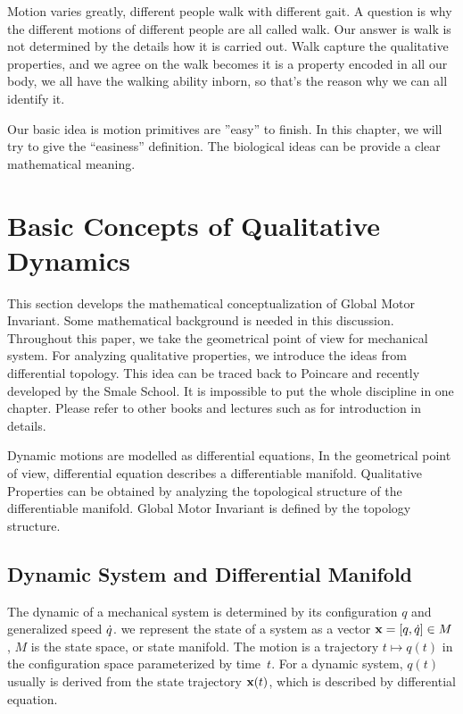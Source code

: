 \ifpdf
    \graphicspath{{GlobalInvariant/GlobalInvariantFigs/PNG/}{GlobalInvariant/GlobalInvariantFigs/PDF/}{GlobalInvariant/GlobalInvariantFigs/}}
\else
    \graphicspath{{GlobalInvariant/GlobalInvariantFigs/EPS/}{GlobalInvariant/GlobalInvariantFigs/}}
\fi

Motion varies greatly, different people walk with different gait. 
A question is why the different motions of different people are all called walk.
Our answer is walk is not determined by the details how it is carried out.
Walk capture the qualitative properties, and we agree on the walk becomes it is a property encoded in all our body, we all have the walking ability inborn, so that’s the reason why we can all identify it.


Our basic idea is motion primitives are ''easy'' to finish. 
In this chapter, we will try to give the “easiness” definition.
The biological ideas can be provide a clear mathematical meaning.


\section{Basic Concepts of Qualitative Dynamics}
This section develops the mathematical conceptualization of Global Motor Invariant.
Some mathematical background is needed in this discussion.
Throughout this paper, we take the geometrical point of view for mechanical system.
For analyzing qualitative properties, we introduce the ideas from differential topology.
This idea can be traced back to Poincare\citep{Poincar'e1899,Poincar'e1885} and recently developed by the Smale School\citep{Smale1970}.
It is impossible to put the whole discipline in one chapter.
Please refer to other books and lectures such as \citep{abraham1978foundations}for introduction in details.


Dynamic motions are modelled as differential equations,
In the geometrical point of view, differential equation describes a differentiable manifold.
Qualitative Properties can be obtained by analyzing the topological structure of the differentiable manifold.
Global Motor Invariant is defined by the topology structure.



\subsection{Dynamic System and Differential Manifold}



The dynamic of a mechanical system is determined by its configuration  $q$ and generalized speed $\dot{q}$. 
we represent the state of a system as a vector $\mathbf{x}=[q,\dot{q}] \in M$,  $M$ is the state space, or state manifold.
The motion is a trajectory $t \mapsto q(t)$ in the configuration space parameterized by time~$t$.
For a dynamic system, $q(t)$ usually is derived from the state trajectory $\mathbf{x}(t)$, which is described by differential equation. 


